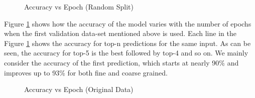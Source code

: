 \begin{figure}[ht]
    \centering
    \caption[Accuracy vs Epoch (Random Split)]{\label{fig:lex_random}Accuracy vs Epoch (Random Split) }
\end{figure}

Figure \ref{fig:lex_random} shows how the accuracy of the model varies with the number of epochs when the first validation data-set mentioned above is used.
Each line in the Figure \ref{fig:lex_random} shows the accuracy for top-n predictions for the same input.
As can be seen, the accuracy for top-5 is the best followed by top-4 and so on.
We mainly consider the accuracy of the first prediction, which starts at nearly 90\% and improves up to 93\% for both fine and coarse grained.

\begin{figure}[ht]
    \centering
    \caption[Accuracy vs Epoch (Original Data)]{\label{fig:lex_original}Accuracy vs Epoch (Original Data) }
\end{figure}

